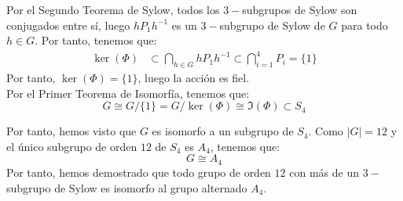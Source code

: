 \begin{ejercicio}
    Por el Segundo Teorema de Sylow, todos los $3-$subgrupos de Sylow son conjugados entre sí, luego $hP_1h^{-1}$ es un $3-$subgrupo de Sylow de $G$ para todo $h\in G$. Por tanto, tenemos que:
    \begin{align*}
        \ker(\Phi) &\subset \bigcap_{h\in G} hP_1h^{-1}
        \subset \bigcap_{i=1}^4 P_i = \{1\}
    \end{align*}
    Por tanto, $\ker(\Phi)=\{1\}$, luego la acción es fiel.\\

    Por el Primer Teorema de Isomorfía, tenemos que:
    \begin{equation*}
        G\cong G/\{1\} = G/{\ker(\Phi)} \cong \Im(\Phi) \subset S_4
    \end{equation*}

    Por tanto, hemos visto que $G$ es isomorfo a un subgrupo de $S_4$. Como $|G|=12$ y el único subgrupo de orden $12$ de $S_4$ es $A_4$, tenemos que:
    \begin{equation*}
        G\cong A_4
    \end{equation*}
    Por tanto, hemos demostrado que todo grupo de orden $12$ con más de un $3-$subgrupo de Sylow es isomorfo al grupo alternado $A_4$.
\end{ejercicio}

